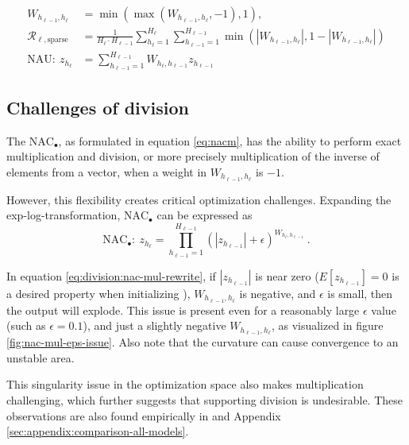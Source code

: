 \begin{align}
W_{h_{\ell-1},h_\ell} &= \min(\max(W_{h_{\ell-1},h_\ell}, -1), 1), \\
\mathcal{R}_{\ell,\mathrm{sparse}} &= \frac{1}{H_\ell \cdot H_{\ell-1}} \sum_{h_\ell=1}^{H_\ell} \sum_{h_{\ell-1}=1}^{H_{\ell-1}} \min\left(|W_{h_{\ell-1},h_\ell}|, 1 - \left|W_{h_{\ell-1},h_\ell}\right|\right) \\
\textrm{NAU}:\ z_{h_\ell} &= \sum_{h_{\ell-1}=1}^{H_{\ell-1}} W_{h_{\ell}, h_{\ell-1}} z_{h_{\ell-1}}
\end{align}

\subsection{Challenges of division} \label{sssec:nac-mul}

The $\text{NAC}_{\bullet}$, as formulated in equation \ref{eq:nacm}, has the ability to perform exact multiplication and division, or more precisely multiplication of the inverse of elements from a vector, when a weight in $W_{h_{\ell-1},h_\ell}$ is $-1$.

However, this flexibility creates critical optimization challenges. Expanding the exp-log-transformation, $\text{NAC}_{\bullet}$ can be expressed as
\begin{equation}
\textrm{NAC}_\bullet:\ z_{h_\ell} = \prod_{h_{\ell-1}=1}^{H_{\ell-1}} (|z_{h_{\ell-1}}| + \epsilon)^{W_{h_{\ell}, h_{\ell-1}}}\ .
\label{eq:division:nac-mul-rewrite}
\end{equation}

In equation \eqref{eq:division:nac-mul-rewrite}, if $|z_{h_{\ell-1}}|$ is near zero ($E[z_{h_{\ell-1}}] = 0$ is a desired property when initializing \cite{glorot-initialization}), $W_{h_{\ell-1},h_\ell}$ is negative, and $\epsilon$ is small, then the output will explode. This issue is present even for a reasonably large $\epsilon$ value (such as $\epsilon = 0.1$), and just a slightly negative $W_{h_{\ell-1},h_\ell}$, as visualized in figure \ref{fig:nac-mul-eps-issue}. Also note that the curvature can cause convergence to an unstable area.

This singularity issue in the optimization space also makes multiplication challenging, which further suggests that supporting division is undesirable. These observations are also found empirically in \citet[table 1]{trask-nalu} and Appendix \ref{sec:appendix:comparison-all-models}.

